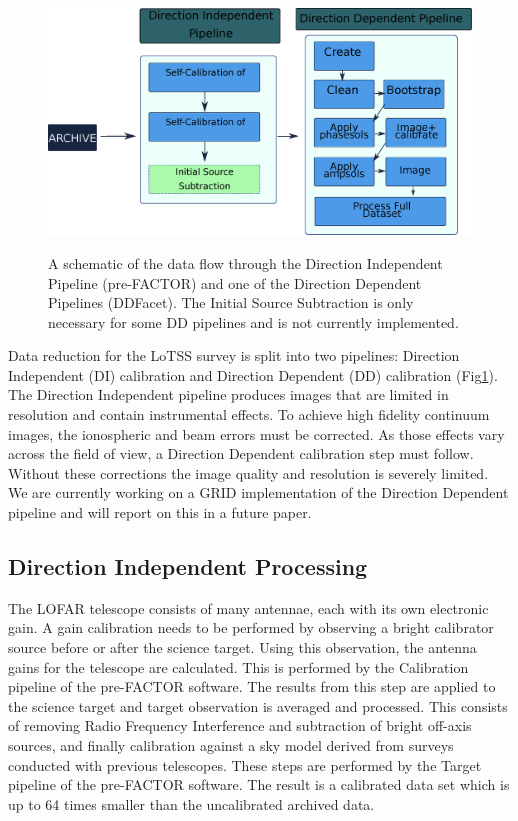 \begin{figure}
 \includegraphics[width=.79\textwidth]{ch3/figures/DIDDpipe.eps}\\
 \caption[Prefactor and DDFacet Data Flow]{A schematic of the data flow through the Direction Independent Pipeline (pre-FACTOR\cite{prefactor}) and one of the Direction Dependent Pipelines (DDFacet). The Initial Source Subtraction is only necessary for some DD pipelines and is not currently implemented. }
 \label{fig:ch3_both_pipes}
\end{figure}


Data reduction for the LoTSS survey is split into two pipelines: Direction Independent (DI) calibration and Direction Dependent (DD) calibration (Fig\ref{fig:ch3_both_pipes}). The Direction Independent pipeline\cite{prefactor}\cite{van2016lofar} produces images that are limited in resolution and contain instrumental effects\cite{lotss}. To achieve high fidelity continuum images, the ionospheric and beam errors must be corrected\cite{lofar_calib}. As those effects vary across the field of view, a Direction Dependent calibration step must follow. Without these corrections the image quality and resolution is severely limited\cite{van2016lofar}.  We are currently working on a GRID implementation of the Direction Dependent pipeline and will report on this in a future paper.


\subsection{Direction Independent Processing}\label{sec:ch3_dirin_process}

The LOFAR telescope consists of many antennae, each with its own electronic gain. A gain calibration needs to be performed by observing a bright calibrator source before or after the science target\cite{lofar_calib}. Using this observation, the antenna gains for the telescope are calculated. This is performed by the Calibration pipeline of the pre-FACTOR software\cite{prefactor}.  The results from this step are applied to the science target and target observation is averaged  and processed. This consists of removing Radio Frequency Interference and subtraction of bright off-axis sources, and finally calibration against a sky model derived from surveys conducted with previous telescopes\cite{lofar_calib}\cite{van2016lofar}. These steps are performed by the Target pipeline of the pre-FACTOR software\cite{prefactor}. The result is a calibrated data set which is up to 64 times smaller than the uncalibrated archived data.


